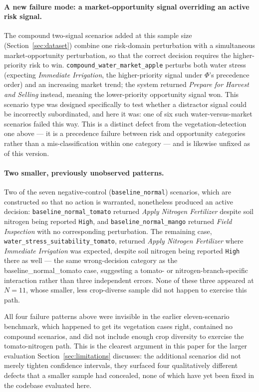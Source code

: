 \documentclass[preprint,12pt]{elsarticle}
\begin{document}
\paragraph{A new failure mode: a market-opportunity signal overriding an
active risk signal.} The compound two-signal scenarios added at this
sample size (Section~\ref{sec:dataset}) combine one risk-domain
perturbation with a simultaneous market-opportunity perturbation, so
that the correct decision requires the higher-priority risk to win.
\texttt{compound\_\allowbreak{}water\_\allowbreak{}market\_\allowbreak{}apple} perturbs both water stress
(expecting \emph{Immediate Irrigation}, the higher-priority signal under
$\Phi$'s precedence order) and an increasing market trend; the system
returned \emph{Prepare for Harvest and Selling} instead, meaning the
lower-priority opportunity signal won. This scenario type was designed
specifically to test whether a distractor signal could be incorrectly
subordinated, and here it was: one of six such water-versus-market
scenarios failed this way. This is a distinct defect from the
vegetation-detection one above --- it is a precedence failure between
risk and opportunity categories rather than a mis-classification within
one category --- and is likewise unfixed as of this version.

\paragraph{Two smaller, previously unobserved patterns.} Two of the
seven negative-control (\texttt{baseline\_normal}) scenarios, which are
constructed so that no action is warranted, nonetheless produced an
active decision: \texttt{baseline\_\allowbreak{}normal\_\allowbreak{}tomato} returned \emph{Apply
Nitrogen Fertilizer} despite soil nitrogen being reported \texttt{High},
and \texttt{baseline\_\allowbreak{}normal\_\allowbreak{}mango} returned \emph{Field Inspection}
with no corresponding perturbation. The remaining case,
\texttt{water\_\allowbreak{}stress\_\allowbreak{}suitability\_\allowbreak{}tomato}, returned \emph{Apply
Nitrogen Fertilizer} where \emph{Immediate Irrigation} was expected,
despite soil nitrogen being reported \texttt{High} there as well --- the
same wrong-decision category as the baseline\_normal\_tomato case,
suggesting a tomato- or nitrogen-branch-specific interaction rather than
three independent errors. None of these three appeared at $N=11$, whose
smaller, less crop-diverse sample did not happen to exercise this path.

All four failure patterns above were invisible in the earlier
eleven-scenario benchmark, which happened to get its vegetation cases
right, contained no compound scenarios, and did not include enough crop
diversity to exercise the tomato-nitrogen path. This is the clearest
argument in this paper for the larger evaluation
Section~\ref{sec:limitations} discusses: the additional scenarios did
not merely tighten confidence intervals, they surfaced four qualitatively
different defects that a smaller sample had concealed, none of which
have yet been fixed in the codebase evaluated here.
\end{document}
